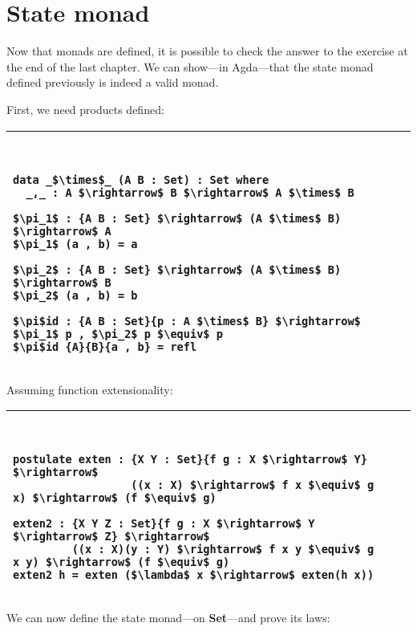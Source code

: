 \documentclass[../main.tex]{subfiles}
\begin{document}
\section{State monad}

Now that monads are defined, it is possible to check the answer to the exercise at the end of the last chapter. We can show---in Agda---that the state monad defined previously is indeed a valid monad.

First, we need products defined:

\begin{tabular}{lll}
\toprule
{\tt
\begin{lstlisting}[mathescape]
data _$\times$_ (A B : Set) : Set where
  _,_ : A $\rightarrow$ B $\rightarrow$ A $\times$ B

$\pi_1$ : {A B : Set} $\rightarrow$ (A $\times$ B) $\rightarrow$ A
$\pi_1$ (a , b) = a

$\pi_2$ : {A B : Set} $\rightarrow$ (A $\times$ B) $\rightarrow$ B
$\pi_2$ (a , b) = b

$\pi$id : {A B : Set}{p : A $\times$ B} $\rightarrow$ $\pi_1$ p , $\pi_2$ p $\equiv$ p
$\pi$id {A}{B}{a , b} = refl
\end{lstlisting}
}
\\
\bottomrule
\end{tabular}

Assuming function extensionality:

\begin{tabular}{lll}
\toprule
{\tt
\begin{lstlisting}[mathescape]
postulate exten : {X Y : Set}{f g : X $\rightarrow$ Y} $\rightarrow$
                  ((x : X) $\rightarrow$ f x $\equiv$ g x) $\rightarrow$ (f $\equiv$ g)

exten2 : {X Y Z : Set}{f g : X $\rightarrow$ Y $\rightarrow$ Z} $\rightarrow$
         ((x : X)(y : Y) $\rightarrow$ f x y $\equiv$ g x y) $\rightarrow$ (f $\equiv$ g)
exten2 h = exten ($\lambda$ x $\rightarrow$ exten(h x))
\end{lstlisting}
}
\\
\bottomrule
\end{tabular}

We can now define the state monad---on \textbf{Set}---and prove its laws:
\end{document}
